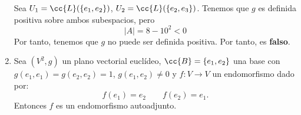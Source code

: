 \documentclass[12pt]{article}
\begin{document}
\begin{ejercicio}
\begin{enumerate}
        Sea $U_1 = \cc{L}(\{e_1, e_2\})$, $U_2 = \cc{L}(\{e_2, e_3\})$. Tenemos que $g$ es definida positiva sobre ambos subespacios, pero $$|A|=8-10^2<0$$
        Por tanto, tenemos que $g$ no puede ser definida positiva. Por tanto, es \textbf{falso}.

        \item Sea $(V^2, g)$ un plano vectorial euclídeo, $\cc{B}=\{e_1, e_2\}$ una base con $g(e_1, e_1)=g(e_2, e_2)=1$, $g(e_1, e_2)\neq 0$ y $f:V\to V$ un endomorfismo dado por:
        \begin{equation*}
            f(e_1)=e_2 \qquad f(e_2)=e_1.
        \end{equation*}
        Entonces $f$ es un endomorfismo autoadjunto.
    \end{enumerate}
\end{ejercicio}
\end{document}
